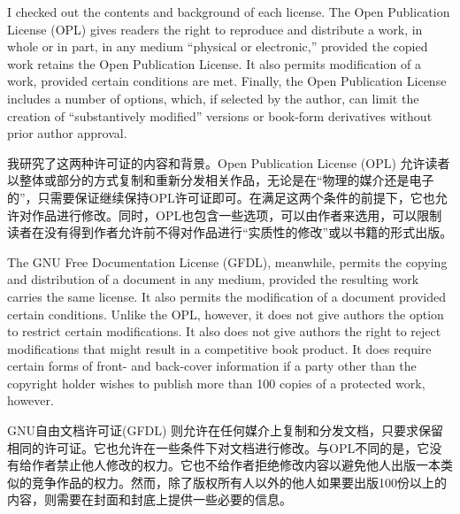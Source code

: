 \ifdefined\eng
I checked out the contents and background of each license. The Open Publication License (OPL) gives readers the right to reproduce and distribute a work, in whole or in part, in any medium ``physical or electronic,'' provided the copied work retains the Open Publication License. It also permits modification of a work, provided certain conditions are met. Finally, the Open Publication License includes a number of options, which, if selected by the author, can limit the creation of ``substantively modified'' versions or book-form derivatives without prior author approval.
\fi

\ifdefined\chs
我研究了这两种许可证的内容和背景。Open Publication License (OPL) 允许读者以整体或部分的方式复制和重新分发相关作品，无论是在“物理的媒介还是电子的”，只需要保证继续保持OPL许可证即可。在满足这两个条件的前提下，它也允许对作品进行修改。同时，OPL也包含一些选项，可以由作者来选用，可以限制读者在没有得到作者允许前不得对作品进行“实质性的修改”或以书籍的形式出版。
\fi

\ifdefined\eng
The GNU Free Documentation License (GFDL),  meanwhile, permits the copying and distribution of a document in any medium, provided the resulting work carries the same license. It also permits the modification of a document provided certain conditions. Unlike the OPL, however, it does not give authors the option to restrict certain modifications. It also does not give authors the right to reject modifications that might result in a competitive book product. It does require certain forms of front- and back-cover information if a party other than the copyright holder wishes to publish more than 100 copies of a protected work, however.
\fi

\ifdefined\chs
GNU自由文档许可证(GFDL) 则允许在任何媒介上复制和分发文档，只要求保留相同的许可证。它也允许在一些条件下对文档进行修改。与OPL不同的是，它没有给作者禁止他人修改的权力。它也不给作者拒绝修改内容以避免他人出版一本类似的竞争作品的权力。然而，除了版权所有人以外的他人如果要出版100份以上的内容，则需要在封面和封底上提供一些必要的信息。
\fi

